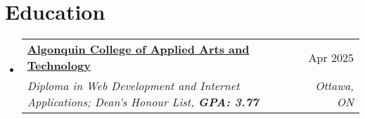 \documentclass[letterpaper,11pt]{article}
\makeatletter
\newcommand{\resumeSubheading}[4]{
  \vspace{-1pt}\item
    \begin{tabular*}{0.97\textwidth}[t]{l@{\extracolsep{\fill}}r}
      \textbf{#1} & #2 \\
      \textit{\small#3} & \textit{\small #4} \\
    \end{tabular*}\vspace{-5pt}
}
\newcommand{\resumeSubHeadingListStart}{\begin{itemize}[leftmargin=*]}
\newcommand{\resumeSubHeadingListEnd}{\end{itemize}}
\makeatother
\begin{document}
\section{Education}
  \resumeSubHeadingListStart
    \resumeSubheading
      {\href{https://www.algonquincollege.com/sat/program/web-development-internet-applications/}{Algonquin College of Applied Arts and Technology}}{Apr 2025}
      {Diploma in Web Development and Internet Applications; Dean's Honour List, \textbf{GPA: 3.77}}{Ottawa, ON}
  \resumeSubHeadingListEnd
\end{document}

